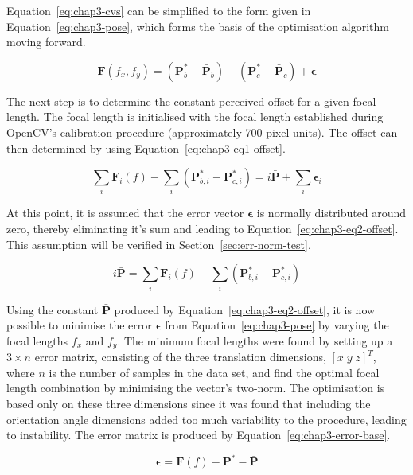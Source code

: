Equation~\ref{eq:chap3-cvs} can be simplified to the form given in Equation~\ref{eq:chap3-pose}, which forms the basis of the optimisation algorithm moving forward.  

\begin{equation}
  \label{eq:chap3-pose}
  \bm{F}(f_x, f_y) = (\bm{P}^*_b - \bar{\bm{P}}_b) - (\bm{P}^*_c - \bar{\bm{P}}_c) + \bm{\epsilon}
\end{equation}

The next step is to determine the constant perceived offset for a given focal length. The focal length is initialised with the focal length established during OpenCV's calibration procedure (approximately 700 pixel units). The offset can then determined by using Equation~\ref{eq:chap3-eq1-offset}.

\begin{equation}
  \label{eq:chap3-eq1-offset}
  \sum\limits_i \bm{F}_i(f) - \sum\limits_i(\bm{P}^*_{b,i} - \bm{P}^*_{c, i}) = i\bar{\bm{P}} + \sum\limits_i\bm{\epsilon}_i
\end{equation}

At this point, it is assumed that the error vector $\bm{\epsilon}$ is normally distributed around zero, thereby eliminating it's sum and leading to Equation~\ref{eq:chap3-eq2-offset}. This assumption will be verified in Section~\ref{sec:err-norm-test}. 

\begin{equation}
  \label{eq:chap3-eq2-offset}
  i\bar{\bm{P}} = \sum\limits_i \bm{F}_i(f) - \sum\limits_i(\bm{P}^*_{b,i} - \bm{P}^*_{c, i})
\end{equation}

Using the constant $\bar{\bm{P}}$ produced by Equation~\ref{eq:chap3-eq2-offset}, it is now possible to minimise the error $\bm{\epsilon}$ from Equation~\ref{eq:chap3-pose} by varying the focal lengths $f_x$ and $f_y$. The minimum focal lengths were found by setting up a $3\times n$ error matrix, consisting of the three translation dimensions, ${[x\;y\;z]}^T$, where $n$ is the number of samples in the data set, and find the optimal focal length combination by minimising the vector's  two-norm. The optimisation is based only on these three dimensions since it was found that including the orientation angle dimensions added too much variability to the procedure, leading to instability. The error matrix is produced by Equation~\ref{eq:chap3-error-base}.

\begin{equation}
  \label{eq:chap3-error-base}
  \bm{\epsilon} = \bm{F}(f) - \bm{P}^* - \bar{\bm{P}}
\end{equation}


